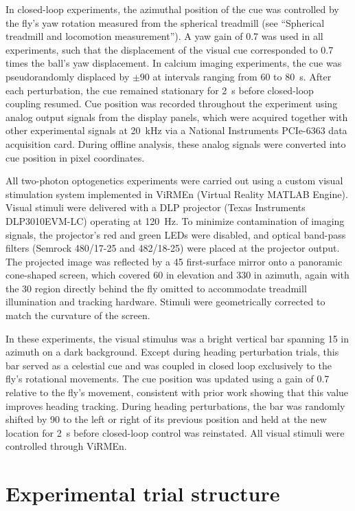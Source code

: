 In closed-loop experiments, the azimuthal position of the cue was controlled by the fly's yaw rotation measured from the spherical treadmill (see ``Spherical treadmill and locomotion measurement''). A yaw gain of 0.7 was used in all experiments, such that the displacement of the visual cue corresponded to 0.7 times the ball's yaw displacement. In calcium imaging experiments, the cue was pseudorandomly displaced by $\pm 90$\textdegree{} at intervals ranging from 60 to 80~s. After each perturbation, the cue remained stationary for 2~s before closed-loop coupling resumed. Cue position was recorded throughout the experiment using analog output signals from the display panels, which were acquired together with other experimental signals at 20~kHz via a National Instruments PCIe-6363 data acquisition card. During offline analysis, these analog signals were converted into cue position in pixel coordinates.

All two-photon optogenetics experiments were carried out using a custom visual stimulation system implemented in ViRMEn (Virtual Reality MATLAB Engine). Visual stimuli were delivered with a DLP projector (Texas Instruments DLP3010EVM-LC) operating at 120~Hz. To minimize contamination of imaging signals, the projector's red and green LEDs were disabled, and optical band-pass filters (Semrock 480/17-25 and 482/18-25) were placed at the projector output. The projected image was reflected by a 45\textdegree{} first-surface mirror onto a panoramic cone-shaped screen, which covered 60\textdegree{} in elevation and 330\textdegree{} in azimuth, again with the 30\textdegree{} region directly behind the fly omitted to accommodate treadmill illumination and tracking hardware. Stimuli were geometrically corrected to match the curvature of the screen.

In these experiments, the visual stimulus was a bright vertical bar spanning 15\textdegree{} in azimuth on a dark background. Except during heading perturbation trials, this bar served as a celestial cue and was coupled in closed loop exclusively to the fly's rotational movements. The cue position was updated using a gain of 0.7 relative to the fly's movement, consistent with prior work showing that this value improves heading tracking. During heading perturbations, the bar was randomly shifted by 90\textdegree{} to the left or right of its previous position and held at the new location for 2~s before closed-loop control was reinstated. All visual stimuli were controlled through ViRMEn.

\section{Experimental trial structure}

